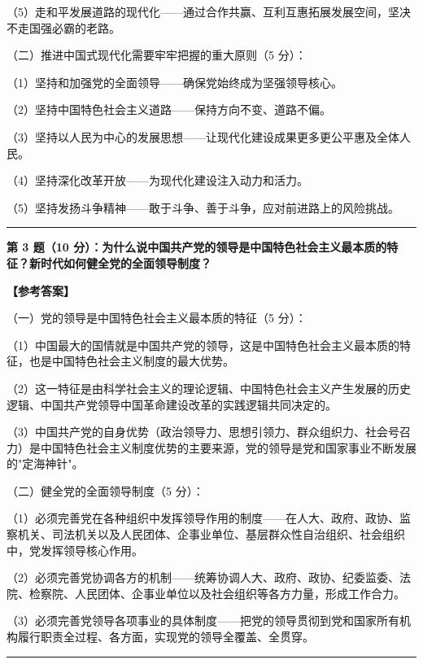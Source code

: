 \documentclass[12pt, a4paper]{article}
\begin{document}
\begin{answerbox}
（5）走和平发展道路的现代化——通过合作共赢、互利互惠拓展发展空间，坚决不走国强必霸的老路。

\noindent（二）推进中国式现代化需要牢牢把握的重大原则（5 分）：

（1）坚持和加强党的全面领导——确保党始终成为坚强领导核心。

（2）坚持中国特色社会主义道路——保持方向不变、道路不偏。

（3）坚持以人民为中心的发展思想——让现代化建设成果更多更公平惠及全体人民。

（4）坚持深化改革开放——为现代化建设注入动力和活力。

（5）坚持发扬斗争精神——敢于斗争、善于斗争，应对前进路上的风险挑战。

\vspace{6pt}
\noindent\rule{\linewidth}{0.4pt}
\vspace{4pt}

\noindent\textbf{第 3 题（10 分）：为什么说中国共产党的领导是中国特色社会主义最本质的特征？新时代如何健全党的全面领导制度？}

\vspace{4pt}
\textbf{【参考答案】}

\noindent（一）党的领导是中国特色社会主义最本质的特征（5 分）：

（1）中国最大的国情就是中国共产党的领导，这是中国特色社会主义最本质的特征，也是中国特色社会主义制度的最大优势。

（2）这一特征是由科学社会主义的理论逻辑、中国特色社会主义产生发展的历史逻辑、中国共产党领导中国革命建设改革的实践逻辑共同决定的。

（3）中国共产党的自身优势（政治领导力、思想引领力、群众组织力、社会号召力）是中国特色社会主义制度优势的主要来源，党的领导是党和国家事业不断发展的"定海神针"。

\noindent（二）健全党的全面领导制度（5 分）：

（1）必须完善党在各种组织中发挥领导作用的制度——在人大、政府、政协、监察机关、司法机关以及人民团体、企事业单位、基层群众性自治组织、社会组织中，党发挥领导核心作用。

（2）必须完善党协调各方的机制——统筹协调人大、政府、政协、纪委监委、法院、检察院、人民团体、企事业单位以及社会组织等各方力量，形成工作合力。

（3）必须完善党领导各项事业的具体制度——把党的领导贯彻到党和国家所有机构履行职责全过程、各方面，实现党的领导全覆盖、全贯穿。

\vspace{6pt}
\noindent\rule{\linewidth}{0.4pt}
\vspace{4pt}


\end{answerbox}
\end{document}
